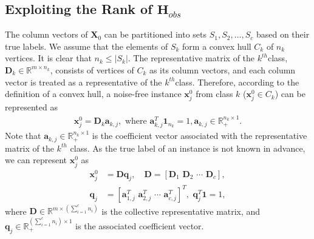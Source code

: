 \documentclass[10pt,journal,compsoc]{IEEEtran}
\begin{document}
\subsection{Exploiting the Rank of $\mathbf{H}_{obs}$} \label{subsec:lowrank_obs}
The column vectors of $\mathbf{X}_0$ can be partitioned into sets $S_1, S_2, \dots, S_c$ based on their true labels. We assume that the elements of $S_k$ form a convex hull $C_k$ of $n_k$ vertices.  It is clear that $n_k \leq |S_k|$.
The representative matrix of the $k^{th}$class, $\mathbf{D}_k \in \mathbb{R}^{m \times n_k}$, consists of vertices of $C_k$ as its column vectors, and each column vector is treated as a representative of the $k^{th}$class.
Therefore, according to the definition of a convex hull, a noise-free instance $\mathbf{x}_j^0$ from class $k$ ($\mathbf{x}_j^0 \in C_k$) can be represented as
\begin{equation}
\begin{aligned}
\mathbf{x}^{0}_j = \mathbf{D}_k \mathbf{a}_{k,j}, \,\, \mathrm{where} \,\, \mathbf{a}_{k,j}^T \mathbf{1}_{n_k} =1, \mathbf{a}_{k,j} \in \mathbb{R}_+^{n_k \times 1}. \label{eq:convexhull}
\end{aligned}
\end{equation}
Note that $\mathbf{a}_{k,j} \in \mathbb{R}_+^{n_k \times 1}$ is the coefficient vector associated with the representative matrix of the $k^{th}$ class.
As the true label of an instance is not known in advance, we can represent $\mathbf{x}^{0}_j$ as
\begin{equation}
\begin{aligned}
\mathbf{x}^{0}_j &= \mathbf{D}\mathbf{q}_j, \quad
\mathbf{D} = [\mathbf{D}_1 \,\, \mathbf{D}_2 \,\, \cdots \,\, \mathbf{D}_c], \\
\mathbf{q}_j &= [\mathbf{a}_{1,j}^T \,\, \mathbf{a}_{2,j}^T \,\, \cdots \,\, \mathbf{a}_{c,j}^T]^T, \,\, \mathbf{q}_j^T \mathbf{1} =1, \label{eq:x_j}
\end{aligned}
\end{equation}
where $\mathbf{D} \in \mathbb{R}^{m \times (\sum_{i=1}^c n_i)}$ is the collective representative matrix, and $\mathbf{q}_j \in \mathbb{R}_+^{(\sum_{i=1}^c n_i) \times 1}$ is the associated coefficient vector.
\end{document}

